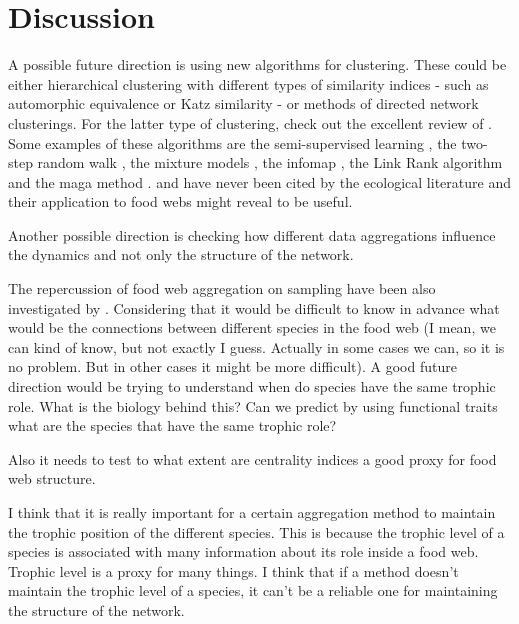 \documentclass[twocolumn]{article}
\begin{document}
\section*{Discussion}
    A possible future direction is using new algorithms for clustering. These could be either hierarchical clustering with different types of similarity indices - such as automorphic equivalence \citep{Wasserman1994} or Katz similarity \citep{Newman2018} - or methods of directed network clusterings. For the latter type of clustering, check out the excellent review of \citet{Malliaros2013}. Some examples of these algorithms are the semi-supervised learning \citep{Zhou2005}, the two-step random walk \citep{Huang2006}, the mixture models \citep{Newman2007,Ramasco2008,Wang2008}, the infomap \citep{Rosvall2008}, the Link Rank algorithm \citep{Kim2010} and the maga method \citep{Zhan2011}. \citet{Zhou2005,Huang2006,Wang2008,Kim2010} and \citet{Zhan2011} have never been cited by the ecological literature and their application to food webs might reveal to be useful. 
    \par Another possible direction is checking how different data aggregations influence the dynamics and not only the structure of the network. 
    \par The repercussion of food web aggregation on sampling have been also investigated by \citet{Patonai2017}.
    Considering that it would be difficult to know in advance what would be the connections between different species in the food web (I mean, we can kind of know, but not exactly I guess. Actually in some cases we can, so it is no problem. But in other cases it might be more difficult). A good future direction would be trying to understand when do species have the same trophic role. What is the biology behind this? Can we predict by using functional traits what are the species that have the same trophic role? 
    \par Also it needs to test to what extent are centrality indices a good proxy for food web structure. 
    \par I think that it is really important for a certain aggregation method to maintain the trophic position of the different species. This is because the trophic level of a species is associated with many information about its role inside a food web. Trophic level is a proxy for many things. %
    I think that if a method doesn't maintain the trophic level of a species, it can't be a reliable one for maintaining the structure of the network. 
\end{document}
